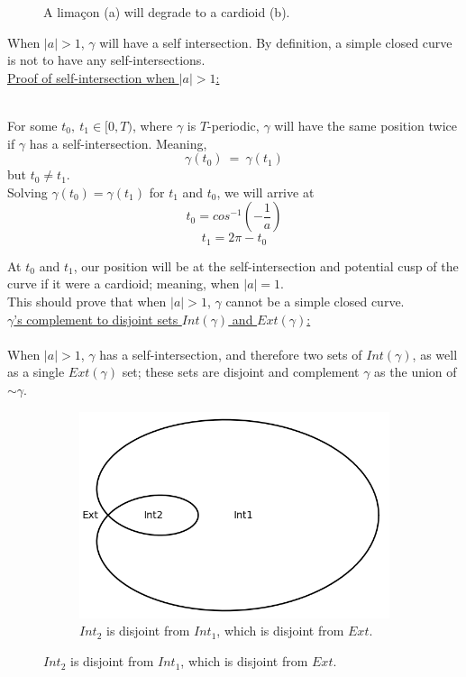 \documentclass[12pt]{article}
\begin{document}
\begin{figure}[h!]
  \caption*{A limaçon (a) will degrade to a cardioid (b).}
\end{figure}
\clearpage
When $|a|>1$, $\gamma$ will have a self intersection. By definition, a simple closed curve is not to have any self-intersections.\\

\noindent
\underline{Proof of self-intersection when $|a|>1$:}\\\\
\indent

For some $t_0, \ t_1 \in [0,T)$, where $\gamma$ is $T$-periodic, $\gamma$ will have the same position twice if $\gamma$ has a self-intersection. Meaning,
$$
\gamma(t_0) \ = \ \gamma(t_1)
$$
but $t_0 \neq t_1$.\\

Solving $\gamma(t_0) = \gamma(t_1)$  for $t_1$ and $t_0$, we will arrive at
$$
t_0 = cos^{-1}\left(-\frac{1}{a}\right)
$$
$$
t_1 = 2\pi - t_0
$$

At $t_0$ and $t_1$, our position will be at the self-intersection and potential cusp of the curve if it were a cardioid; meaning, when $|a| = 1$.\\
This should prove that when $|a|>1$, $\gamma$ cannot be a simple closed curve.\\

\noindent
\underline{$\gamma$'s complement to disjoint sets $Int(\gamma)$ and $Ext(\gamma)$:}\\\\
\indent
When $|a|>1$, $\gamma$ has a self-intersection, and therefore two sets of $Int(\gamma)$, as well as a single $Ext(\gamma)$ set; these sets are disjoint and complement $\gamma$ as the union of $\sim\gamma$.

\begin{figure}[h!]
  \centering
      \begin{subfigure}[b]{0.6\linewidth}
    \includegraphics[width=\linewidth]{./assets/3-1-1/limacon-int-ext.png}
    \caption*{$Int_2$ is disjoint from $Int_1$, which is disjoint from $Ext$.}
  \end{subfigure}
  \end{figure}
  
\end{document}

